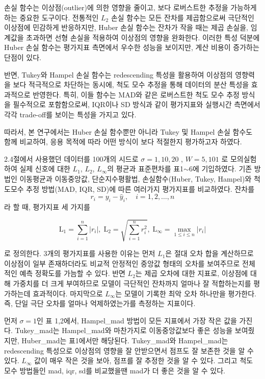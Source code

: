 \documentclass[letterpaper,12pt]{article}
\begin{document}
{손실 함수는 이상점(outlier)에 의한 영향을 줄이고, 보다 로버스트한 추정을 가능하게 하는 중요한 도구이다. 전통적인 $L_2$ 손실 함수는 모든 잔차를 제곱함으로써 극단적인 이상점에 민감하게 반응하지만, Huber 손실 함수는 잔차가 작을 때는 제곱 손실을, 임계값을 초과하면 선형 손실을 적용하여 이상점의 영향을 완화한다. 이러한 특성 덕분에 Huber 손실 함수는 평가지표 측면에서 우수한 성능을 보이지만, 계산 비용이 증가하는 단점이 있다.

반면, Tukey와 Hampel 손실 함수는 redescending 특성을 활용하여 이상점의 영향력을 보다 적극적으로 차단하는 동시에, 척도 모수 추정을 통해 데이터의 분산 특성을 효과적으로 반영한다. 특히, 이들 함수는 MAD와 같은 로버스트한 척도 모수 추정 방식을 필수적으로 포함함으로써, IQR이나 SD 방식과 같이 평가지표와 실행시간 측면에서 각각 trade-off를 보이는 특성을 가지고 있다.

따라서, 본 연구에서는 Huber 손실 함수뿐만 아니라 Tukey 및 Hampel 손실 함수도 함께 비교하여, 응용 목적에 따라 어떤 방식이 보다 적절한지 평가하고자 하였다.

2.4절에서 사용했던 데이터를 100개의 시드로 $\sigma=1,10,20$ , $W=5,101$ 로 모의실험하여 실제 신호에 대한 $L_1$, $L_2$, $L_\infty$의 평균과 표준편차를 표1$\sim$6에 기입하였다.
기존 방법인 이동평균과 이동중앙값, 단순지수평활법, 손실함수(Huber, Tukey, Hampel)와 척도모수 추정 방법(MAD, IQR, SD)에 따른 여러가지 평가지표를 비교하였다. 
잔차를
\[
r_i = y_i - \hat y_i,\quad i = 1,2,\dots,n
\]
라 할 때, 평가지표 세 가지를

\[
\mathrm{L}_1
= \sum_{i=1}^n \bigl|r_i\bigr|,\;
\mathrm{L}_2 = \sqrt{\sum_{i=1}^n r_i^2},\;
\mathrm{L}_\infty = \max_{1 \le i \le n} \bigl|r_i\bigr|
\]

로 정의한다.
3개의 평가지표를 사용한 이유는 먼저 $L_1$은 절대 오차 합을 계산하므로 이상점이 일부 존재하더라도 비교적 안정적인 중앙값 형태의 오차를 보여주므로 전체적인 예측 정확도를 가늠할 수 있다. 반면 $L_2$는 제곱 오차에 대한 지표로, 이상점에 대해 가중치를 더 크게 부여하므로 모델이 극단적인 잔차까지 얼마나 잘 적합하는지를 평가하는데 효과적이다. 마지막으로 $L_\infty$는 모델이 기록한 최악 오차 하나만을 평가한다. 즉, 단일 극단 오차를 얼마나 억제하였는가를 측정하는 지표이다.

먼저 $\sigma=1$인 표 1,2에서, Hampel\_mad 방법이 모든 지표에서 가장 작은 값을 가진다. Tukey\_mad는 Hampel\_mad와 마찬가지로 이동중앙값보다 좋은 성능을 보여줬지만, Huber\_mad는 표1에서만 해당된다. 
Tukey\_mad와 Hampel\_mad는 redescending 특성으로 이상점의 영향을 잘 안받으면서 점프도 잘 보존한 것을 알 수 있다.
$L_\infty$ 값이 매우 작은 것을 보아, 점프를 잘 추정한 것을 알 수 있다. 그리고 척도 모수 방법들인 mad, iqr, sd를 비교했을땐 mad가 더 좋은 것을 알 수 있다.

}
\end{document}
